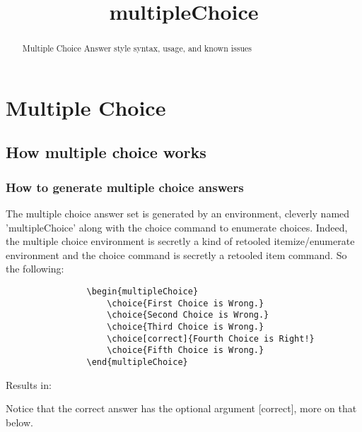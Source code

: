 \documentclass{ximera}
\title{multipleChoice}
\begin{document}
\begin{abstract}
    Multiple Choice Answer style syntax, usage, and known issues 
\end{abstract}
\maketitle

\section*{Multiple Choice}
    \subsection*{How multiple choice works}
    
    
        \subsubsection*{How to generate multiple choice answers}
        
            The multiple choice answer set is generated by an environment, cleverly named 'multipleChoice' along with the choice command to enumerate choices. Indeed, the multiple choice environment is secretly a kind of retooled itemize/enumerate environment and the choice command is secretly a retooled item command. So the following:
            \begin{verbatim}
                \begin{multipleChoice}
                    \choice{First Choice is Wrong.}
                    \choice{Second Choice is Wrong.}
                    \choice{Third Choice is Wrong.}
                    \choice[correct]{Fourth Choice is Right!}
                    \choice{Fifth Choice is Wrong.}
                \end{multipleChoice}
            \end{verbatim}
            Results in:
            \begin{multipleChoice}
            \end{multipleChoice}
            
            Notice that the correct answer has the optional argument [correct], more on that below.
            
\end{document}
